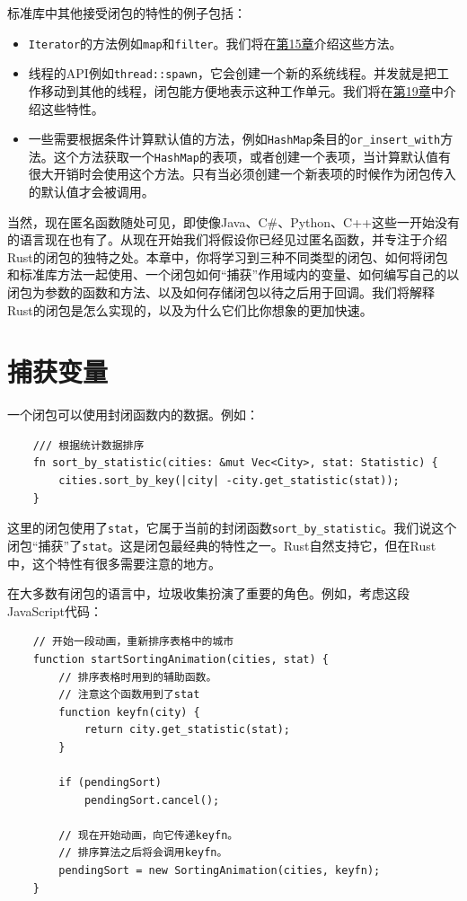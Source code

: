 标准库中其他接受闭包的特性的例子包括：
\begin{itemize}
    \item \texttt{Iterator}的方法例如\texttt{map}和\texttt{filter}。我们将在\hyperref[ch15]{第15章}介绍这些方法。
    \item 线程的API例如\texttt{thread::spawn}，它会创建一个新的系统线程。并发就是把工作移动到其他的线程，闭包能方便地表示这种工作单元。我们将在\hyperref[ch19]{第19章}中介绍这些特性。
    \item 一些需要根据条件计算默认值的方法，例如\texttt{HashMap}条目的\texttt{or\_insert\_with}方法。这个方法获取一个\texttt{HashMap}的表项，或者创建一个表项，当计算默认值有很大开销时会使用这个方法。只有当必须创建一个新表项的时候作为闭包传入的默认值才会被调用。
\end{itemize}

当然，现在匿名函数随处可见，即使像Java、C\#、Python、C++这些一开始没有的语言现在也有了。从现在开始我们将假设你已经见过匿名函数，并专注于介绍Rust的闭包的独特之处。本章中，你将学习到三种不同类型的闭包、如何将闭包和标准库方法一起使用、一个闭包如何“捕获”作用域内的变量、如何编写自己的以闭包为参数的函数和方法、以及如何存储闭包以待之后用于回调。我们将解释Rust的闭包是怎么实现的，以及为什么它们比你想象的更加快速。

\section{捕获变量}
一个闭包可以使用封闭函数内的数据。例如：
\begin{verbatim}
    /// 根据统计数据排序
    fn sort_by_statistic(cities: &mut Vec<City>, stat: Statistic) {
        cities.sort_by_key(|city| -city.get_statistic(stat));
    }
\end{verbatim}

这里的闭包使用了\texttt{stat}，它属于当前的封闭函数\texttt{sort\_by\_statistic}。我们说这个闭包“捕获”了\texttt{stat}。这是闭包最经典的特性之一。Rust自然支持它，但在Rust中，这个特性有很多需要注意的地方。

在大多数有闭包的语言中，垃圾收集扮演了重要的角色。例如，考虑这段JavaScript代码：
\begin{verbatim}
    // 开始一段动画，重新排序表格中的城市
    function startSortingAnimation(cities, stat) {
        // 排序表格时用到的辅助函数。
        // 注意这个函数用到了stat
        function keyfn(city) {
            return city.get_statistic(stat);
        }

        if (pendingSort)
            pendingSort.cancel();

        // 现在开始动画，向它传递keyfn。
        // 排序算法之后将会调用keyfn。
        pendingSort = new SortingAnimation(cities, keyfn);
    }
\end{verbatim}

